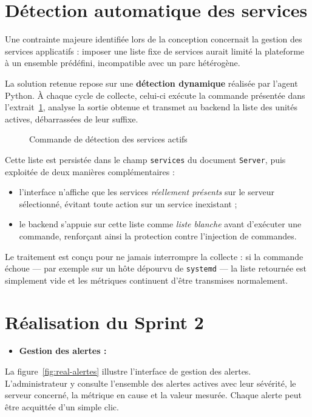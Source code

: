 \section{Détection automatique des services}
Une contrainte majeure identifiée lors de la conception concernait la gestion des
services applicatifs : imposer une liste fixe de services aurait limité la plateforme à
un ensemble prédéfini, incompatible avec un parc hétérogène.

La solution retenue repose sur une \textbf{détection dynamique} réalisée par l'agent
Python. À chaque cycle de collecte, celui-ci exécute la commande présentée dans
l'extrait~\ref{lst:systemctl}, analyse la sortie obtenue et transmet au backend la liste
des unités actives, débarrassées de leur suffixe.

\begin{figure}[H]
\centering
{}
\caption{Commande de détection des services actifs}
\label{lst:systemctl}
\end{figure}

Cette liste est persistée dans le champ \texttt{services} du document \texttt{Server},
puis exploitée de deux manières complémentaires :

\begin{itemize}[label=]
  \item l'interface n'affiche que les services \emph{réellement présents} sur le serveur
        sélectionné, évitant toute action sur un service inexistant ;
  \item le backend s'appuie sur cette liste comme \emph{liste blanche} avant d'exécuter
        une commande, renforçant ainsi la protection contre l'injection de commandes.
\end{itemize}

Le traitement est conçu pour ne jamais interrompre la collecte : si la commande échoue —
par exemple sur un hôte dépourvu de \texttt{systemd} — la liste retournée est simplement
vide et les métriques continuent d'être transmises normalement.

\section{Réalisation du Sprint 2}

\begin{itemize}[label=]
\item \textbf{Gestion des alertes :}
\end{itemize}
La figure~\ref{fig:real-alertes} illustre l'interface de gestion des alertes.
L'administrateur y consulte l'ensemble des alertes actives avec leur sévérité, le serveur
concerné, la métrique en cause et la valeur mesurée. Chaque alerte peut être acquittée
d'un simple clic.

